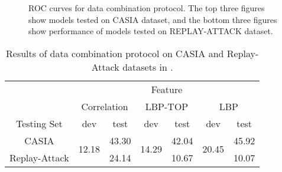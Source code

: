 \documentclass[letterpaper, 10 pt, conference]{ieeeconf}
\begin{document}
\begin{figure*}
\begin{minipage}[b]{0.3\linewidth}
\centering
\centerline{}
\end{minipage}
\hfill
\begin{minipage}[b]{0.3\linewidth}
\centering
\centerline{}
\end{minipage}
\hfill
\begin{minipage}[b]{0.3\linewidth}
\centering
\centerline{}
\end{minipage}
\\
\\
\begin{minipage}[b]{0.3\linewidth}
\centering
\centerline{}
\end{minipage}
\hfill
\begin{minipage}[b]{0.3\linewidth}
\centering
\centerline{}
\end{minipage}
\hfill
\begin{minipage}[b]{0.3\linewidth}
\centering
\centerline{}
\end{minipage}
\caption{ROC curves for data combination protocol. The top three figures show models tested on CASIA dataset, and the bottom three figures show performance of models tested on REPLAY-ATTACK dataset.}
\label{Fig_9}
\end{figure*}

\begin{table}[!htb]
\caption{Results of data combination protocol on CASIA and Replay-Attack datasets in \cite{Face_Anti_Spoofing_Pereira_2013}.}
\label{TB_COMBINED_PREVIOUS}
\centering
\begin{tabular}{|c|c|c|c|c|c|c|}
\cline{2-7}
\multicolumn{1}{c|}{}      & \multicolumn{6}{c|}{Feature}     \\
       \cline{2-7}
 \multicolumn{1}{c|}{}     & \multicolumn{2}{c|}{Correlation} & \multicolumn{2}{c|}{LBP-TOP} & \multicolumn{2}{c|}{LBP} \\
       \hline
Testing Set      & dev & test & dev & test & dev & test \\ 
       \hline
CASIA   & \multirow{2}{*}{12.18} & 43.30 & \multirow{2}{*}{14.29} & 42.04 & \multirow{2}{*}{20.45} & 45.92 \\
Replay-Attack  & & 24.14 & & 10.67 & & 10.07 \\
\hline
\end{tabular}
\end{table}
\end{document}
